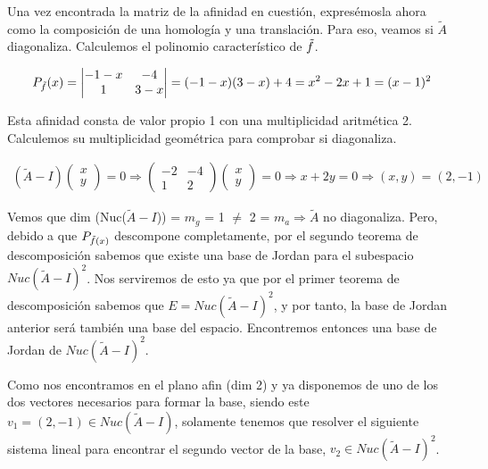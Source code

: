 Una vez encontrada la matriz de la afinidad en cuestión, expresémosla ahora como la composición de una homología y una translación. Para eso, veamos si $\widetilde{A}$ diagonaliza. Calculemos el polinomio característico de $\Tilde{f}$.

\begin{gather*}
    P_{\Tilde{f}}(x) = 
    \begin{vmatrix}
    -1 - x & -4\\
    1 & 3 - x
    \end{vmatrix}
    = (-1-x)(3-x) + 4 = x^{2} -2x + 1 = (x - 1)^{2}
\end{gather*}

Esta afinidad consta de valor propio 1 con una multiplicidad aritmética 2. Calculemos su multiplicidad geométrica para comprobar si diagonaliza.

\begin{gather*}
    (\widetilde{A}- I)
    \begin{pmatrix}
    x\\ y
    \end{pmatrix}
    = 0 \Longrightarrow
    \begin{pmatrix}
    -2 & -4\\
    1 & 2
    \end{pmatrix}
    \begin{pmatrix}
    x\\ y
    \end{pmatrix}
    = 0 \Longrightarrow x + 2y = 0 \Longrightarrow (x, y) = (2, -1)
\end{gather*}

\pagebreak

Vemos que dim (Nuc($\widetilde{A} - I$)) = $m_g$ = 1 $\neq$ 2 = $m_a \Longrightarrow \widetilde{A}$ no diagonaliza. Pero, debido a que $P_{\Tilde{f}(x)}$ descompone completamente, por el segundo teorema de descomposición sabemos que existe una base de Jordan para el subespacio $Nuc(\widetilde{A} - I)^{2}$. Nos serviremos de esto ya que por el primer teorema de descomposición sabemos que $E = Nuc(\widetilde{A} - I)^{2}$, y por tanto, la base de Jordan anterior será también una base del espacio. Encontremos entonces una base de Jordan de $Nuc(\widetilde{A} - I)^{2}$.

Como nos encontramos en el plano afin (dim 2) y ya disponemos de uno de los dos vectores necesarios para formar la base, siendo este $v_1 = (2, -1) \in Nuc(\widetilde{A} - I)$, solamente tenemos que resolver el siguiente sistema lineal para encontrar el segundo vector de la base, $v_2 \in Nuc(\widetilde{A} - I)^{2}$.

